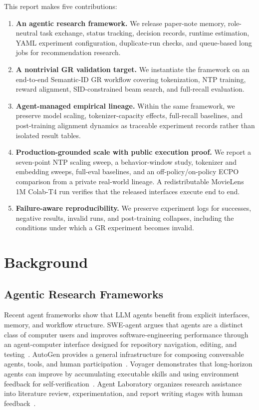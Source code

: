 \documentclass[11pt]{article}
\begin{document}
This report makes five contributions:

\begin{enumerate}
  \item \textbf{An agentic research framework.} We release paper-note memory, role-neutral task exchange, status tracking, decision records, runtime estimation, YAML experiment configuration, duplicate-run checks, and queue-based long jobs for recommendation research.
  \item \textbf{A nontrivial GR validation target.} We instantiate the framework on an end-to-end Semantic-ID GR workflow covering tokenization, NTP training, reward alignment, SID-constrained beam search, and full-recall evaluation.
  \item \textbf{Agent-managed empirical lineage.} Within the same framework, we preserve model scaling, tokenizer-capacity effects, full-recall baselines, and post-training alignment dynamics as traceable experiment records rather than isolated result tables.
  \item \textbf{Production-grounded scale with public execution proof.} We report a seven-point NTP scaling sweep, a behavior-window study, tokenizer and embedding sweeps, full-eval baselines, and an off-policy/on-policy ECPO comparison from a private real-world lineage. A redistributable MovieLens 1M Colab-T4 run verifies that the released interfaces execute end to end.
  \item \textbf{Failure-aware reproducibility.} We preserve experiment logs for successes, negative results, invalid runs, and post-training collapses, including the conditions under which a GR experiment becomes invalid.
\end{enumerate}

\section{Background}

\subsection{Agentic Research Frameworks}

Recent agent frameworks show that LLM agents benefit from explicit interfaces, memory, and workflow structure. SWE-agent argues that agents are a distinct class of computer users and improves software-engineering performance through an agent-computer interface designed for repository navigation, editing, and testing~\citep{sweagent}. AutoGen provides a general infrastructure for composing conversable agents, tools, and human participation~\citep{autogen}. Voyager demonstrates that long-horizon agents can improve by accumulating executable skills and using environment feedback for self-verification~\citep{voyager}. Agent Laboratory organizes research assistance into literature review, experimentation, and report writing stages with human feedback~\citep{agentlaboratory}.
\end{document}
